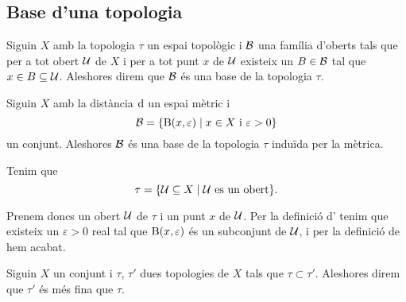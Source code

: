 \documentclass[../../Main.tex]{subfiles}
\begin{document}
	\subsection{Base d'una topologia}
	\begin{definition}
		\label{def:base d'una topologia}
		Siguin \(X\) amb la topologia \(\tau\) un espai topològic i \(\mathcal{B}\) una família d'oberts tals que per a tot obert \(\mathcal{U}\) de \(X\) i per a tot punt \(x\) de \(\mathcal{U}\) existeix un \(B\in\mathcal{B}\) tal que \(x\in B\subseteq\mathcal{U}\). Aleshores direm que \(\mathcal{B}\) és una base de la topologia \(\tau\).
	\end{definition}
	\begin{example}
		Siguin \(X\) amb la distància \(\operatorname{d}\) un espai mètric i
		\[
		    \mathcal{B}=\{\operatorname{B}(x,\varepsilon)\mid x\in X\text{ i }\varepsilon>0\}
		\]
		un conjunt. Aleshores \(\mathcal{B}\) és una base de la topologia \(\tau\) induïda per la mètrica.
		\begin{solution}
			Tenim que
			\[
			    \tau=\{\mathcal{U}\subseteq X\mid\mathcal{U}\text{ es un obert}\}.
			\]
			
			Prenem doncs un obert \(\mathcal{U}\) de \(\tau\) i un punt \(x\) de \(\mathcal{U}\). Per la definició d' tenim que existeix un \(\varepsilon>0\) real tal que \(\operatorname{B}(x,\varepsilon)\) és un subconjunt de \(\mathcal{U}\), i per la definició de  hem acabat.
		\end{solution}
	\end{example}
	\begin{definition}
		\label{def:finor d'una topologia}
		Siguin \(X\) un conjunt i \(\tau\), \(\tau'\) dues topologies de \(X\) tals que \(\tau\subset\tau'\). Aleshores direm que \(\tau'\) és més fina que \(\tau\).
	\end{definition}
%			
\end{document}
